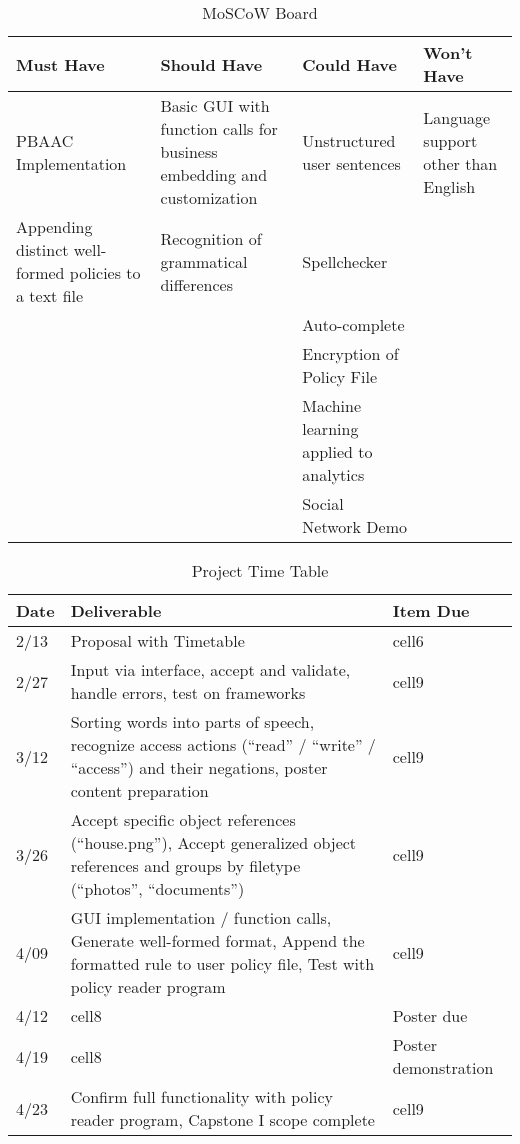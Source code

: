 \documentclass[12pt]{article}
\begin{document}
\begin{table}[p]
    \begin{center}
        \begin{tabular}{ | m{1.3in} | m{1.3in}| m{1.3in} | m{1.3in} | } 
        \hline
        Must Have & Should Have & Could Have & Won't Have \\ 
        \hline
        \hline
        PBAAC Implementation & Basic GUI with function calls for business embedding and customization & Unstructured user sentences & Language support other than English \\ 
        \hline
        Appending distinct well-formed policies to a text file & Recognition of grammatical differences & Spellchecker &   \\ 
        \hline
          &   & Auto-complete &   \\ 
        \hline
          &   & Encryption of Policy File &   \\ 
        \hline
          &   & Machine learning applied to analytics &   \\ 
        \hline
          &   & Social Network Demo &   \\ 
        \hline
        \end{tabular}
        \caption{MoSCoW Board}
        \label{table:1}
    \end{center}
\end{table}

\begin{table}[p]
    \begin{center}
        \begin{tabular}{ | m{0.4in} | m{4in}| m{1.6in} | }
        \hline
        Date & Deliverable & Item Due \\ 
        \hline
        2/13 & Proposal with Timetable & cell6 \\ 
        \hline
        2/27 & Input via interface, accept and validate, handle errors, test on frameworks & cell9 \\ 
        \hline
        3/12 & Sorting words into parts of speech, recognize access actions (“read” / “write” / “access”) and their negations, poster content preparation & cell9 \\ 
        \hline
        3/26 & Accept specific object references (“house.png”), Accept generalized object references and groups by filetype (“photos”, “documents”) & cell9 \\ 
        \hline
        4/09 & GUI implementation / function calls, Generate well-formed format, Append the formatted rule to user policy file, Test with policy reader program & cell9 \\ 
        \hline
        4/12 & cell8 & Poster due \\ 
        \hline
        4/19 & cell8 & Poster demonstration \\ 
        \hline
        4/23 & Confirm full functionality with policy reader program, Capstone I scope complete & cell9 \\ 
        \hline
        \end{tabular}
        \caption{Project Time Table}
        \label{table:2}
    \end{center}
\end{table}



\end{document}
